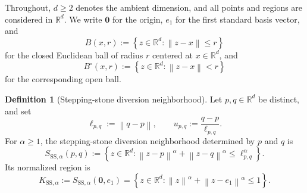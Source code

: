 \documentclass[a4paper,fleqn]{cas-sc}
\theoremstyle{definition}
\newtheorem{definition}{Definition}
\theoremstyle{remark}
\newcommand{\R}{\mathds{R}}
\newcommand{\norm}[1]{\left\lVert #1\right\rVert}
\newcommand{\set}[1]{\left\{#1\right\}}
\newcommand{\ellpq}{\ell_{p,q}}
\newcommand{\upq}{u_{p,q}}
\newcommand{\0}{\mathbf{0}}
\begin{document}
Throughout, \(d\geq2\) denotes the ambient dimension, and all points and
regions are considered in \(\R^d\). We write \(\0\) for the origin,
\(e_1\) for the first standard basis vector,
and
\begin{equation}
    B(x,r)
    :=
    \set{z\in\R^d:\norm{z-x}\leq r}
\end{equation}
for the closed Euclidean ball of radius $r$ centered at $x\in\R^d$, and
\begin{equation}
    B^\circ(x,r)
    :=
    \set{z\in\R^d:\norm{z-x}<r}
\end{equation}
for the corresponding open ball.
\begin{definition}[Stepping-stone diversion neighborhood]
Let $p,q\in\R^d$ be distinct, and set
\begin{equation}
    \ellpq:=\norm{q-p},
    \qquad
    \upq:=\frac{q-p}{\ellpq}.
\end{equation}
For $\alpha\geq1$, the stepping-stone diversion neighborhood determined by
$p$ and $q$ is
\begin{equation}\label{eq:ss-region}
    S_{\mathrm{SS},\alpha}(p,q)
    :=
    \set{
        z\in\R^d:
        \norm{z-p}^{\alpha}
        +
        \norm{z-q}^{\alpha}
        \leq
        \ellpq^{\alpha}
    }.
\end{equation}
Its normalized region is
\begin{equation}\label{eq:unit-region}
    K_{\mathrm{SS},\alpha}
    :=
    S_{\mathrm{SS},\alpha}(\0,e_1)
    =
    \set{
        z\in\R^d:
        \norm{z}^{\alpha}
        +
        \norm{z-e_1}^{\alpha}
        \leq1
    }.
\end{equation}
\end{definition}
\end{document}
